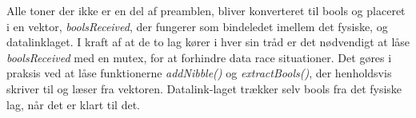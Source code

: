 Alle toner der ikke er en del af preamblen, bliver konverteret til bools og placeret i en vektor, \textit{boolsReceived}, der fungerer som bindeledet imellem det fysiske, og datalinklaget. I kraft af at de to lag kører i hver sin tråd er det nødvendigt at låse \textit{boolsReceived} med en mutex, for at forhindre data race situationer. Det gøres i praksis ved at låse funktionerne \textit{addNibble()} og \textit{extractBools()}, der henholdsvis skriver til og læser fra vektoren. Datalink-laget trækker selv bools fra det fysiske lag, når det er klart til det.\\

